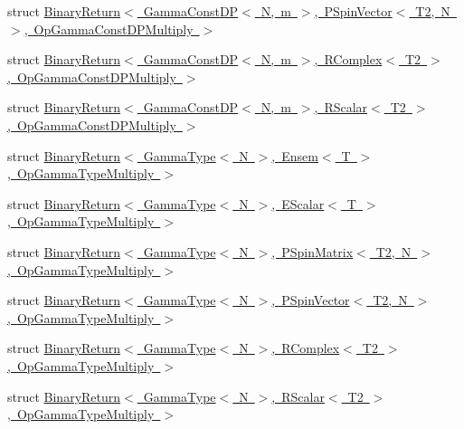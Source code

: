 \begin{DoxyCompactItemize}
\item 
struct \mbox{\hyperlink{structENSEM_1_1BinaryReturn_3_01GammaConstDP_3_01N_00_01m_01_4_00_01PSpinVector_3_01T2_00_01N_01c511155a335117739782ed7ccba11d26}{Binary\+Return$<$ Gamma\+Const\+D\+P$<$ N, m $>$, P\+Spin\+Vector$<$ T2, N $>$, Op\+Gamma\+Const\+D\+P\+Multiply $>$}}
\item 
struct \mbox{\hyperlink{structENSEM_1_1BinaryReturn_3_01GammaConstDP_3_01N_00_01m_01_4_00_01RComplex_3_01T2_01_4_00_01OpGammaConstDPMultiply_01_4}{Binary\+Return$<$ Gamma\+Const\+D\+P$<$ N, m $>$, R\+Complex$<$ T2 $>$, Op\+Gamma\+Const\+D\+P\+Multiply $>$}}
\item 
struct \mbox{\hyperlink{structENSEM_1_1BinaryReturn_3_01GammaConstDP_3_01N_00_01m_01_4_00_01RScalar_3_01T2_01_4_00_01OpGammaConstDPMultiply_01_4}{Binary\+Return$<$ Gamma\+Const\+D\+P$<$ N, m $>$, R\+Scalar$<$ T2 $>$, Op\+Gamma\+Const\+D\+P\+Multiply $>$}}
\item 
struct \mbox{\hyperlink{structENSEM_1_1BinaryReturn_3_01GammaType_3_01N_01_4_00_01Ensem_3_01T_01_4_00_01OpGammaTypeMultiply_01_4}{Binary\+Return$<$ Gamma\+Type$<$ N $>$, Ensem$<$ T $>$, Op\+Gamma\+Type\+Multiply $>$}}
\item 
struct \mbox{\hyperlink{structENSEM_1_1BinaryReturn_3_01GammaType_3_01N_01_4_00_01EScalar_3_01T_01_4_00_01OpGammaTypeMultiply_01_4}{Binary\+Return$<$ Gamma\+Type$<$ N $>$, E\+Scalar$<$ T $>$, Op\+Gamma\+Type\+Multiply $>$}}
\item 
struct \mbox{\hyperlink{structENSEM_1_1BinaryReturn_3_01GammaType_3_01N_01_4_00_01PSpinMatrix_3_01T2_00_01N_01_4_00_01OpGammaTypeMultiply_01_4}{Binary\+Return$<$ Gamma\+Type$<$ N $>$, P\+Spin\+Matrix$<$ T2, N $>$, Op\+Gamma\+Type\+Multiply $>$}}
\item 
struct \mbox{\hyperlink{structENSEM_1_1BinaryReturn_3_01GammaType_3_01N_01_4_00_01PSpinVector_3_01T2_00_01N_01_4_00_01OpGammaTypeMultiply_01_4}{Binary\+Return$<$ Gamma\+Type$<$ N $>$, P\+Spin\+Vector$<$ T2, N $>$, Op\+Gamma\+Type\+Multiply $>$}}
\item 
struct \mbox{\hyperlink{structENSEM_1_1BinaryReturn_3_01GammaType_3_01N_01_4_00_01RComplex_3_01T2_01_4_00_01OpGammaTypeMultiply_01_4}{Binary\+Return$<$ Gamma\+Type$<$ N $>$, R\+Complex$<$ T2 $>$, Op\+Gamma\+Type\+Multiply $>$}}
\item 
struct \mbox{\hyperlink{structENSEM_1_1BinaryReturn_3_01GammaType_3_01N_01_4_00_01RScalar_3_01T2_01_4_00_01OpGammaTypeMultiply_01_4}{Binary\+Return$<$ Gamma\+Type$<$ N $>$, R\+Scalar$<$ T2 $>$, Op\+Gamma\+Type\+Multiply $>$}}
\item 

\end{DoxyCompactItemize}
